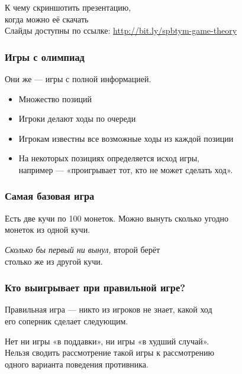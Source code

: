 \begin{frame} \begin{center}
	{\Large К чему скриншотить презентацию,\smallskip\\
		когда можно её скачать} \\ [0.9cm]
	{\small Слайды доступны по ссылке: \url{http://bit.ly/spbtym-game-theory}}
\end{center} \end{frame}

\begin{frame} \frametitle{Игры с олимпиад}
	Они же — игры с полной информацией.

\begin{itemize} \itemsep=2.25mm
	\item Множество позиций
	\item Игроки делают ходы по очереди
	\item Игрокам известны все возможные ходы из каждой позиции
	\item На некоторых позициях определяется исход игры, \\
		например — «проигрывает тот, кто не может сделать ход».
\end{itemize}
\end{frame}

\begin{frame} \frametitle{Самая базовая игра}
	Есть две кучи по 100 монеток. Можно вынуть сколько угодно \\
	монеток из одной кучи.
	\medskip \pause

\begin{center}  \end{center}\medskip

	{\it Сколько бы первый ни вынул,} второй берёт \\
	столько же из другой кучи.
\end{frame}

\begin{frame} \frametitle{Кто выигрывает при правильной игре?}
	Правильная игра — никто из игроков не знает, какой ход \\
	его соперник сделает следующим. \bigskip
	
	Нет ни игры «в поддавки», ни игры «в худший случай». \\
	Нельзя сводить рассмотрение такой игры к рассмотрению \\
	одного варианта поведения противника.
\end{frame}

